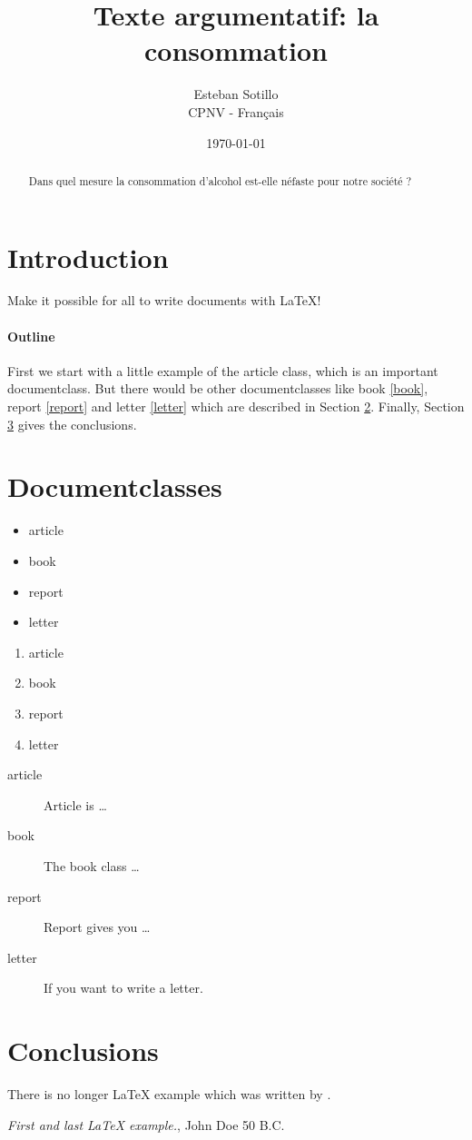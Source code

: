 \documentclass[a4paper,11pt]{article}
\title{Texte argumentatif: la consommation}
\author{Esteban Sotillo \\
    CPNV - Français 
    }
\date{\today}
\begin{document}
\maketitle
\begin{abstract}\begin{center}
  Dans quel mesure la consommation d'alcohol est-elle néfaste pour notre société ? 
\end{center}\end{abstract}

\pagebreak

  

  
\section{Introduction}
Make it possible for all to write documents with \LaTeX{}!
  
\paragraph{Outline}
First we start with a little example of the article class, which is an 
important documentclass. But there would be other documentclasses like 
book \ref{book}, report \ref{report} and letter \ref{letter} which are 
described in Section \ref{documentclasses}. Finally, Section 
\ref{conclusions} gives the conclusions.
  
  
  
\section{Documentclasses} \label{documentclasses}
  
\begin{itemize}
	\item article
	\item book 
	\item report 
	\item letter 
\end{itemize}
  
  
\begin{enumerate}
	\item article
	\item book 
	\item report 
	\item letter 
\end{enumerate}
  
\begin{description}
	\item[article\label{article}]{Article is \ldots}
	\item[book\label{book}]{The book class \ldots}
	\item[report\label{report}]{Report gives you \ldots}
	\item[letter\label{letter}]{If you want to write a letter.}
\end{description}
  
  
\section{Conclusions}\label{conclusions}
There is no longer \LaTeX{} example which was written by \cite{doe}.
  
  
\pagebreak 

\begin{thebibliography}{9}
	 \emph{First and last \LaTeX{} example.},
	John Doe 50 B.C. 
\end{thebibliography}

\tableofcontents
\end{document}
